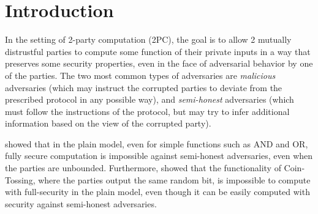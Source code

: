 \documentclass{llncs}
\newcommand{\OT}{\operatorname{OT}}
\newcommand{\bOT}[2]{#1\text{-out-of-}#2\text{ bit-}\OT}
\begin{document}
\begin{abstract}

\end{abstract}

\section{Introduction}
In the setting of 2-party computation (2PC), the goal is to allow 2 mutually distrustful parties to compute some function of their private inputs in a way that preserves some security properties, even in the face of adversarial behavior by one of the parties. The two most common types of adversaries are \emph{malicious} adversaries (which may instruct the corrupted parties to deviate from the prescribed protocol in any possible way), and \emph{semi-honest} adversaries (which must follow the instructions of the protocol, but may try to infer additional information based on the view of the corrupted party).

\citet{CK89} showed that in the plain model, even for simple functions such as AND and OR, fully secure computation is impossible against semi-honest adversaries, even when the parties are unbounded. Furthermore, \citet{Cleve86} showed that the functionality of Coin-Tossing, where the parties output the same random bit, is impossible to compute with full-security in the plain model, even though it can be easily computed with security against semi-honest adversaries.%
\end{document}
